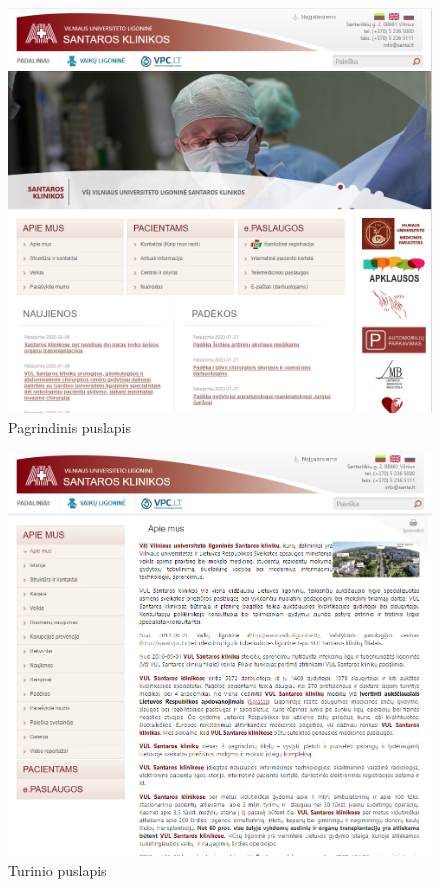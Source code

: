 \documentclass{VUMIFPSkursinis}
\begin{document}
\appendix  %

\begin{figure}[H]
    \centering
    \includegraphics[scale=0.65]{img/Pagrindinis}
    \caption{Pagrindinis puslapis}
    \label{img:PagrindinisPuslapis}
\end{figure}
\begin{figure}[H]
    \centering
    \includegraphics[scale=0.65]{img/Turinys}
    \caption{Turinio puslapis}
    \label{img:TurinysPuslapis}
\end{figure}
\end{document}
